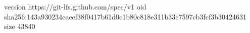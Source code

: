 version https://git-lfs.github.com/spec/v1
oid sha256:143a930234eaecf38f0417b61d0c1b80c818e311b33e7597cb3fcf3b30424631
size 43840
